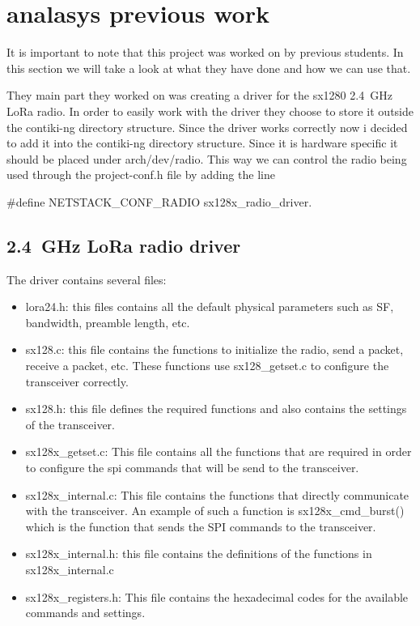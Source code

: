 \newpage


\section{analasys previous work}
It is important to note that this project was worked on by previous students. In this section we will take a look at what they have done and how  we can use that.

They main part they worked on was creating a driver for the sx1280 2.4~GHz LoRa radio. In order to easily work with the driver they choose to store it outside the contiki-ng directory structure. Since the driver works correctly now i decided to add it into the contiki-ng directory structure. Since it is hardware specific it should be placed under arch/dev/radio. This way we can control the radio being used through the project-conf.h file by adding the line      

\#define NETSTACK\_CONF\_RADIO sx128x\_radio\_driver.

\subsection{2.4~GHz LoRa radio driver}
The driver contains several files:
\begin{itemize}
    \item lora24.h: this files contains all the default physical parameters such as SF, bandwidth, preamble length, etc.
    \item sx128.c: this file contains the functions to initialize the radio, send a packet, receive a packet, etc. These functions use sx128\_getset.c to configure the transceiver correctly.
    \item sx128.h: this file defines the required functions and also contains the settings of the transceiver.
    \item sx128x\_getset.c: This file contains all the functions that are required in order to configure the spi commands that will be send to the transceiver.
    \item sx128x\_internal.c: This file contains the functions that directly communicate with the transceiver. An example of such a function is sx128x\_cmd\_burst() which is the function that sends the SPI commands to the transceiver.
    \item sx128x\_internal.h: this file contains the definitions of the functions in sx128x\_internal.c
    \item sx128x\_registers.h: This file contains the hexadecimal codes for the available commands and settings. 
\end{itemize}

